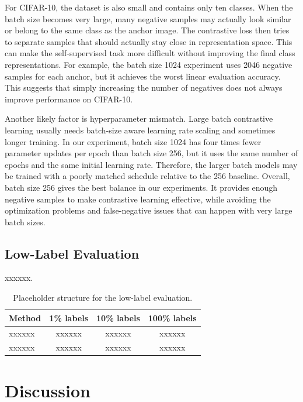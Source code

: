 \documentclass[10pt]{article}
\begin{document}
For CIFAR-10, the dataset is also small and contains only ten classes. When the batch size becomes very large, many negative samples may actually look similar or belong to the same class as the anchor image. The contrastive loss then tries to separate samples that should actually stay close in representation space. This can make the self-supervised task more difficult without improving the final class representations. For example, the batch size 1024 experiment uses 2046 negative samples for each anchor, but it achieves the worst linear evaluation accuracy. This suggests that simply increasing the number of negatives does not always improve performance on CIFAR-10.

Another likely factor is hyperparameter mismatch. Large batch contrastive learning usually needs batch-size aware learning rate scaling and sometimes longer training. In our experiment, batch size 1024 has four times fewer parameter updates per epoch than batch size 256, but it uses the same number of epochs and the same initial learning rate. Therefore, the larger batch models may be trained with a poorly matched schedule relative to the 256 baseline. Overall, batch size 256 gives the best balance in our experiments. It provides enough negative samples to make contrastive learning effective, while avoiding the optimization problems and false-negative issues that can happen with very large batch sizes.


\subsection{Low-Label Evaluation}

xxxxxx.

\begin{table}[H]
\centering
\small
\begin{tabular}{lccc}
\toprule
\textbf{Method} & \textbf{1\% labels} & \textbf{10\% labels} & \textbf{100\% labels} \\
\midrule
xxxxxx & xxxxxx & xxxxxx & xxxxxx \\
xxxxxx & xxxxxx & xxxxxx & xxxxxx \\
\bottomrule
\end{tabular}
\caption{Placeholder structure for the low-label evaluation.}
\label{tab:low-label-placeholder}
\end{table}

\section{Discussion}
\end{document}
